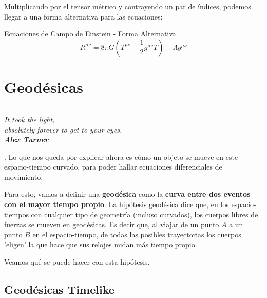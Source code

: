Multiplicando por el tensor métrico y contrayendo un par de índices, podemos llegar a una forma alternativa para las ecuaciones:

\begin{remarkbox}{Ecuaciones de Campo de Einstein - Forma Alternativa}
\begin{equation}
    R^{\mu\nu}=8 \pi G\left(T^{\mu\nu}-\frac{1}{2} g^{\mu\nu} T\right)+\Lambda g^{\mu\nu}
    \label{campoeinsteincontravariante}
\end{equation}
\end{remarkbox}

\newpage

\section{\huge{Geodésicas}}
\textcolor{myred}{\hrule}
\begin{flushright}
\textit{It took the light,\\ absolutely forever to get to your eyes.\\\textbf{Alex Turner}}
\end{flushright}

. Lo que nos queda por explicar ahora es cómo un objeto se mueve en este espacio-tiempo curvado, para poder hallar ecuaciones diferenciales de movimiento. 

Para esto, vamos a definir una \textbf{geodésica} como la \textbf{curva entre dos eventos con el mayor tiempo propio}. La hipótesis geodésica dice que, en los espacio-tiempos con cualquier tipo de geometría (incluso curvados), los cuerpos libres de fuerzas se mueven en geodésicas. Es decir que, al viajar de un punto $A$ a un punto $B$ en el espacio-tiempo, de todas las posibles trayectorias los cuerpos 'eligen' la que hace que sus relojes midan más tiempo propio.

Veamos qué se puede hacer con esta hipótesis.

\subsection*{\textbf{Geodésicas Timelike}}

